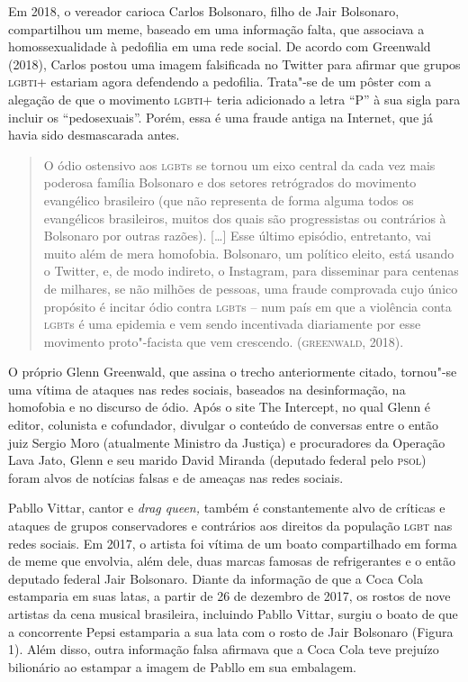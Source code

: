 Em 2018, o vereador carioca Carlos Bolsonaro, filho de Jair Bolsonaro,
compartilhou um meme, baseado em uma informação falta, que associava a
homossexualidade à pedofilia em uma rede social. De acordo com Greenwald
(2018), Carlos postou uma imagem falsificada no Twitter para afirmar que
grupos \textsc{lgbti}+ estariam agora defendendo a pedofilia. Trata"-se de um
pôster com a alegação de que o movimento \textsc{lgbti}+ teria adicionado a letra
``P'' à sua sigla para incluir os ``pedosexuais''. Porém, essa é uma
fraude antiga na Internet, que já havia sido desmascarada antes.

\begin{quote}
O ódio ostensivo aos \textsc{lgbt}s se tornou um eixo central da cada vez mais
poderosa família Bolsonaro e dos setores retrógrados do movimento
evangélico brasileiro (que não representa de forma alguma todos os
evangélicos brasileiros, muitos dos quais são progressistas ou
contrários à Bolsonaro por outras razões). {[}\ldots{}{]} Esse último
episódio, entretanto, vai muito além de mera homofobia. Bolsonaro, um
político eleito, está usando o Twitter, e, de modo indireto, o
Instagram, para disseminar para centenas de milhares, se não milhões de
pessoas, uma fraude comprovada cujo único propósito é incitar ódio
contra \textsc{lgbt}s -- num país em que a violência conta \textsc{lgbt}s é uma epidemia e
vem sendo incentivada diariamente por esse movimento proto"-facista que
vem crescendo. (\textsc{greenwald}, 2018).
\end{quote}

O próprio Glenn Greenwald, que assina o trecho anteriormente citado,
tornou"-se uma vítima de ataques nas redes sociais, baseados na
desinformação, na homofobia e no discurso de ódio. Após o site The
Intercept, no qual Glenn é editor, colunista e cofundador, divulgar o
conteúdo de conversas entre o então juiz Sergio Moro (atualmente
Ministro da Justiça) e procuradores da Operação Lava Jato, Glenn e seu
marido David Miranda (deputado federal pelo \textsc{psol}) foram alvos de
notícias falsas e de ameaças nas redes sociais.

Pabllo Vittar, cantor e \emph{drag queen,} também é constantemente alvo
de críticas e ataques de grupos conservadores e contrários aos direitos
da população \textsc{lgbt} nas redes sociais. Em 2017, o artista foi vítima de um
boato compartilhado em forma de meme que envolvia, além dele, duas
marcas famosas de refrigerantes e o então deputado federal Jair
Bolsonaro. Diante da informação de que a Coca Cola estamparia em suas
latas, a partir de 26 de dezembro de 2017, os rostos de nove artistas da
cena musical brasileira, incluindo Pabllo Vittar, surgiu o boato de que
a concorrente Pepsi estamparia a sua lata com o rosto de Jair Bolsonaro
(Figura 1). Além disso, outra informação falsa afirmava que a Coca Cola
teve prejuízo bilionário ao estampar a imagem de Pabllo em sua
embalagem.

